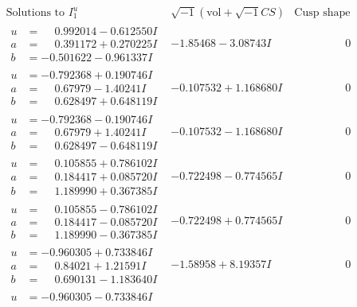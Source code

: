 \documentclass[1p]{elsarticle_modified}
\theoremstyle{definition}
\newcommand{\I}{\sqrt{-1}}
\begin{document}
$$\begin{array}{c|c|c}
\text{Solutions to }I^u_{1}& \I (\text{vol} + \sqrt{-1}CS) & \text{Cusp shape}\\
 \hline 
\begin{aligned}
u &= \phantom{-}0.992014 - 0.612550 I \\
a &= \phantom{-}0.391172 + 0.270225 I \\
b &= -0.501622 - 0.961337 I\end{aligned}
 & -1.85468 - 3.08743 I & \phantom{-0.000000 } 0 \\ \hline\begin{aligned}
u &= -0.792368 + 0.190746 I \\
a &= \phantom{-}0.67979 - 1.40241 I \\
b &= \phantom{-}0.628497 + 0.648119 I\end{aligned}
 & -0.107532 + 1.168680 I & \phantom{-0.000000 } 0 \\ \hline\begin{aligned}
u &= -0.792368 - 0.190746 I \\
a &= \phantom{-}0.67979 + 1.40241 I \\
b &= \phantom{-}0.628497 - 0.648119 I\end{aligned}
 & -0.107532 - 1.168680 I & \phantom{-0.000000 } 0 \\ \hline\begin{aligned}
u &= \phantom{-}0.105855 + 0.786102 I \\
a &= \phantom{-}0.184417 + 0.085720 I \\
b &= \phantom{-}1.189990 + 0.367385 I\end{aligned}
 & -0.722498 - 0.774565 I & \phantom{-0.000000 } 0 \\ \hline\begin{aligned}
u &= \phantom{-}0.105855 - 0.786102 I \\
a &= \phantom{-}0.184417 - 0.085720 I \\
b &= \phantom{-}1.189990 - 0.367385 I\end{aligned}
 & -0.722498 + 0.774565 I & \phantom{-0.000000 } 0 \\ \hline\begin{aligned}
u &= -0.960305 + 0.733846 I \\
a &= \phantom{-}0.84021 + 1.21591 I \\
b &= \phantom{-}0.690131 - 1.183640 I\end{aligned}
 & -1.58958 + 8.19357 I & \phantom{-0.000000 } 0 \\ \hline\begin{aligned}
u &= -0.960305 - 0.733846 I \\

\end{aligned}
\end{array}$$
\end{document}

